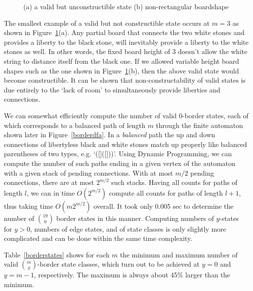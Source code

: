 \documentclass{article}
\begin{document}
\begin{figure}
\begin{center}
{\epsfxsize=2cm } \hspace{4cm}
{\epsfxsize=2cm }
\end{center}
\caption{(a) a valid but unconstructible state (b) non-rectangular boardshape}
\label{validshape}
\end{figure}

The smallest example of a valid but not constructible state occurs at $m=3$
as shown in Figure~\ref{validshape}(a).
Any partial board that connects the two white stones
and provides a liberty to the black stone,
will inevitably provide a liberty to the white stones as well.
In other words,
the fixed board height of $3$ doesn't allow the white string to distance
itself from the black one.
If we allowed variable height board shapes
such as the one shown in Figure~\ref{validshape}(b),
then the above valid state would become constructible.
It can be shown that
non-constructability of valid states is due entirely to the `lack
of room' to simultaneously provide liberties and connections.

We can somewhat efficiently compute the number of valid $0$-border states,
each of which corresponds to a balanced path of length $m$
through the finite automaton shown later in Figure~\ref{borderdfa}.
In a {\em balanced} path the
up and down connections of libertyless black and white stones
match up properly like balanced parentheses of two types, e.g. `([]([]))'.
Using Dynamic Programming,
we can compute the number of such paths
ending in a given vertex of the automaton with a given
stack of pending connections. With at most $m/2$ pending
connections, there are at most $2^{m/2}$ such stacks.
Having all counts for paths of length $l$, we can in time
$O(2^{m/2})$ compute all counts for paths of length $l+1$,
thus taking time $O(m2^{m/2})$ overall.
It took only 0.005 sec to determine the number of $\binom{19}{0}$ border states
in this manner.
Computing numbers of $y$-states for $y>0$,
numbers of edge states, and of state classes is only slightly more complicated
and can be done within the same time complexity.

Table~\ref{borderstates} shows for each $m$ the minimum and maximum
number of valid $\binom{m}{y}$-border state classes,
which turn out to be achieved at $y=0$ and $y=m-1$, respectively.
The maximum is always about 45\% larger than the minimum.
\end{document}
